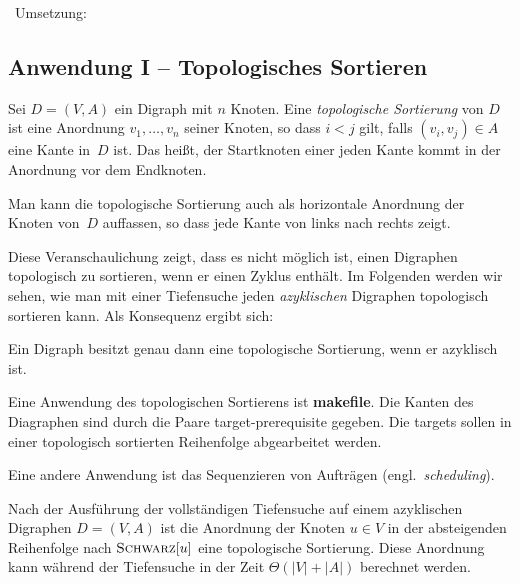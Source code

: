 \begin{bem}\ Umsetzung: 

\end{bem} 


\condclearpage
\subsection{Anwendung I -- Topologisches Sortieren}

\begin{defn} 
Sei $D=(V,A)$ ein Digraph mit $n$ Knoten.
Eine \emph{topologische Sortierung} von $D$ ist eine Anordnung $v_1,\ldots,v_n$ seiner Knoten, so dass $i < j$ gilt, falls $(v_i,v_j) \in A$ eine Kante in~$D$ ist.
Das heißt, der Startknoten einer jeden Kante kommt in der Anordnung vor dem Endknoten.
\end{defn} 

\begin{bem}
Man kann die topologische Sortierung auch als horizontale Anordnung der Knoten von~$D$ auffassen, so dass jede Kante von links nach rechts zeigt.

Diese Veranschaulichung zeigt, dass es nicht möglich ist, einen Digraphen topologisch zu sortieren, wenn er einen Zyklus enthält.
Im Folgenden werden wir sehen, wie man mit einer Tiefensuche jeden \emph{azyklischen} Digraphen topologisch sortieren kann.
Als Konsequenz ergibt sich:
\end{bem} 

\begin{prop}
Ein Digraph besitzt genau dann eine topologische Sortierung, wenn er azyklisch ist.
\end{prop}

\begin{bem}
	Eine Anwendung des topologischen Sortierens ist \textbf{makefile}. Die Kanten des Diagraphen sind durch  die Paare target-prerequisite gegeben. Die targets sollen in einer topologisch sortierten Reihenfolge abgearbeitet werden. 
	
	Eine andere Anwendung ist das Sequenzieren von Aufträgen (engl.~\emph{scheduling}).
\end{bem}


\begin{thm}
	Nach der Ausführung der vollständigen Tiefensuche auf einem azyklischen Digraphen $D=(V,A)$ ist die Anordnung der Knoten $u \in V$ in der absteigenden Reihenfolge nach $\mathop{\text{\textsc{Schwarz}}}[u]$ eine topologische Sortierung. Diese Anordnung kann während der Tiefensuche in der Zeit $\Theta(|V|+|A|)$ berechnet werden. 
\end{thm}

